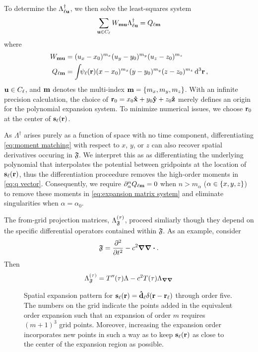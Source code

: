 To determine the $\Lambda_{\ell \vb{u}}^\dagger$, we then solve the least-squares system
\begin{equation}
  \sum_{\vb{u} \in C_\ell} W_{\vb{m}\vb{u}}\Lambda_{\ell\vb{u}}^\dagger = Q_{\ell\vb{m}}
  \label{eq:expansion matrix system}
\end{equation}
where
\begin{subequations}
  \begin{align}
    W_{\vb{m}\vb{u}} &= (u_x - x_0)^{m_x} (u_y - y_0)^{m_y} (u_z - z_0)^{m_z} \label{eq:w matrix} \\
    Q_{\ell \vb{m}} &= \int_{} \psi_\ell(\vb{r}) (x - x_0)^{m_x} (y - y_0)^{m_y} (z - z_0)^{m_z} \dd[3]{\vb{r}} \label{eq:q vector},
  \end{align}
\end{subequations}
$\vb{u} \in C_\ell$, and $\vb{m}$ denotes the multi-index $\vb{m} = \qty{m_x, m_y, m_z}$.
With an infinite precision calculation, the choice of $\vb{r}_0 = x_0 \vu{x} + y_0 \vu{y} + z_0 \vu{z}$ merely defines an origin for the polynomial expansion system.
To minimize numerical issues, we choose $\vb{r}_0$ at the center of $\vb{s}_\ell(\vb{r})$.

As $\Lambda^\dagger$ arises purely as a function of space with no time component, differentiating \cref{eq:moment matching} with respect to $x$, $y$, or $z$ can also recover spatial derivatives occuring in $\mathfrak{F}$.
We interpret this as as differentiating the underlying polynomial that interpolates the potential between gridpoints at the location of $\vb{s}_\ell(\vb{r})$, thus the differentiation proceedure removes the high-order moments in \cref{eq:q vector}.
Consequently, we require $\partial_\alpha^n Q_{\ell \vb{m}} = 0$ when $n > m_\alpha$ ($\alpha \in \qty{x, y, z}$) to remove these moments in \cref{eq:expansion matrix system} and eliminate singularities when $\alpha = \alpha_0$.


The from-grid projection matrices, $\Lambda_\mathfrak{F}^\qty(\tau)$, proceed simliarly though they depend on the specific differential operators contained within $\mathfrak{F}$.
As an example, consider
\begin{equation}
  \mathfrak{F} = \pdv[2]{t} - c^2 \grad \grad \boldsymbol{\cdot}.
\end{equation}
Then
\begin{equation}
  \Lambda_\mathfrak{F}^\qty(\tau) = T''(\tau) \Lambda - c^2 T(\tau) \Lambda_{\grad \grad}
\end{equation}

\begin{figure}
  \centering
  \caption{\label{fig:expansion pattern}Spatial expansion pattern for $\vb{s}_\ell(\vb{r}) = \vu{d}_\ell \delta(\vb{r} - \vb{r}_\ell)$ through order five.
    The numbers on the grid indicate the points added in the equivalent order expansion such that an expansion of order $m$ requires $(m + 1)^3$ grid points.
    Moreover, increasing the expansion order incorporates new points in such a way as to keep $\vb{s}_\ell(\vb{r})$ as close to the center of the expansion region as possible.
  }
\end{figure}

